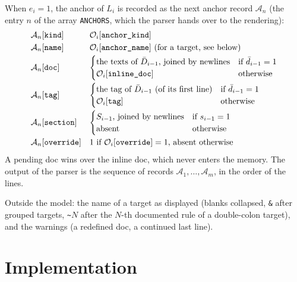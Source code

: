 \documentclass[11pt]{article}
\newcommand{\code}[1]{\mbox{\texttt{#1}}}
\newcommand{\field}[1]{\texttt{#1}}
\newcommand{\Obs}[1]{\mathcal{O}_i[\field{#1}]}
\newcommand{\Acr}[1]{\mathcal{A}_n[\field{#1}]}
\begin{document}
When $e_i = 1$, the anchor of $L_i$ is recorded as the next anchor record $\mathcal{A}_n$
(the entry $n$ of the array \code{ANCHORS}, which the parser hands over to the rendering):
\begin{equation}
  \begin{array}{@{}l@{\quad}l@{}}
    \Acr{kind} & \Obs{anchor\_kind}\\[3pt]
    \Acr{name} & \Obs{anchor\_name} \text{ (for a target, see below)}\\[3pt]
    \Acr{doc} & \begin{cases}
                  \text{the texts of } \bar D_{i-1} \text{, joined by newlines} &
                    \text{if } \bar d_{i-1} = 1\\
                  \Obs{inline\_doc} & \text{otherwise}
                \end{cases}\\[12pt]
    \Acr{tag} & \begin{cases}
                  \text{the tag of } \bar D_{i-1} \text{ (of its first line)} &
                    \text{if } \bar d_{i-1} = 1\\
                  \Obs{tag} & \text{otherwise}
                \end{cases}\\[12pt]
    \Acr{section} & \begin{cases}
                      S_{i-1} \text{, joined by newlines} & \text{if } s_{i-1} = 1\\
                      \text{absent} & \text{otherwise}
                    \end{cases}\\[12pt]
    \Acr{override} & 1 \text{ if } \Obs{override} = 1 \text{, absent otherwise}
  \end{array}
  \label{eq:record}
\end{equation}
A pending doc wins over the inline doc, which never enters the memory. The output of the
parser is the sequence of records $\mathcal{A}_1, \dots, \mathcal{A}_m$, in the order of the
lines.

Outside the model: the name of a target as displayed (blanks collapsed, \code{\&} after
grouped targets, \code{\textasciitilde}$N$ after the $N$-th documented rule of a
double-colon target), and the warnings (a redefined doc, a continued last line).

\section{Implementation}
\label{sec:implementation}
\end{document}
